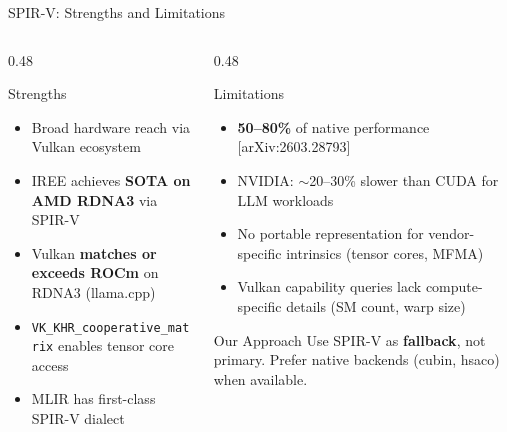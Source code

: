 \documentclass[aspectratio=169,10pt]{beamer}
\begin{document}
\begin{frame}{SPIR-V: Strengths and Limitations}
  \begin{columns}[T]
    \begin{column}{0.48\textwidth}
      \begin{block}{Strengths}
        \begin{itemize}
          \item Broad hardware reach via Vulkan ecosystem
          \item IREE achieves \textbf{SOTA on AMD RDNA3} via SPIR-V
          \item Vulkan \textbf{matches or exceeds ROCm} on RDNA3 (llama.cpp)
          \item \texttt{VK\_KHR\_cooperative\_matrix} enables tensor core access
          \item MLIR has first-class SPIR-V dialect
        \end{itemize}
      \end{block}
    \end{column}
    \begin{column}{0.48\textwidth}
      \begin{alertblock}{Limitations}
        \begin{itemize}
          \item \textbf{50--80\%} of native performance [arXiv:2603.28793]
          \item NVIDIA: $\sim$20--30\% slower than CUDA for LLM workloads
          \item No portable representation for vendor-specific intrinsics (tensor cores, MFMA)
          \item Vulkan capability queries lack compute-specific details (SM count, warp size)
        \end{itemize}
      \end{alertblock}
      \vspace{0.5em}
      \begin{exampleblock}{Our Approach}
        Use SPIR-V as \textbf{fallback}, not primary.
        Prefer native backends (cubin, hsaco) when available.
      \end{exampleblock}
    \end{column}
  \end{columns}
\end{frame}
\end{document}
